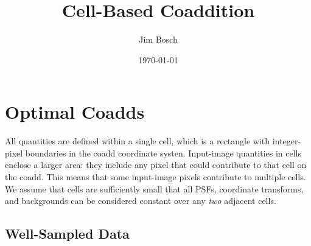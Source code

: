 \documentclass[DM,authoryear,toc]{lsstdoc}
\title{Cell-Based Coaddition}
\author{%
Jim Bosch
}
\date{\today}
\begin{document}
\maketitle

\section{Optimal Coadds}

All quantities are defined within a single cell, which is a rectangle with integer-pixel boundaries in the coadd coordinate systen.
Input-image quantities in cells enclose a larger area: they include any pixel that could contribute to that cell on the coadd.
This means that some input-image pixels contribute to multiple cells.
We assume that cells are sufficiently small that all PSFs, coordinate transforms, and backgrounds can be considered constant over any \emph{two} adjacent cells.

\subsection{Well-Sampled Data}
\end{document}
